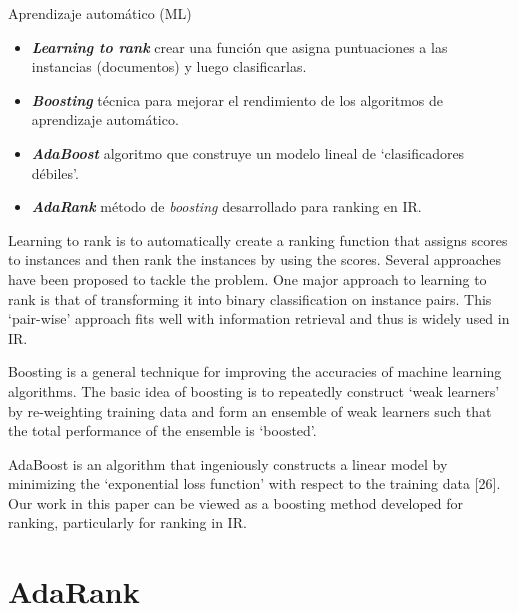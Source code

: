 \documentclass{beamer}
\begin{document}
\begin{frame}{Aprendizaje automático (ML)}
    \begin{itemize}
        \item \textbf{\textit{Learning to rank}} crear una función que asigna puntuaciones a las instancias (documentos) y luego clasificarlas.
        \item \textbf{\textit{Boosting}} técnica para mejorar el rendimiento de los algoritmos de aprendizaje automático.
        \item \textbf{\textit{AdaBoost}} algoritmo que construye un modelo lineal de ‘clasificadores débiles’.
        \item \textbf{\textit{AdaRank}} método de \textit{boosting} desarrollado para ranking en IR.
    \end{itemize}

    \begin{note}
        {Learning to rank is to automatically create a ranking function that assigns scores to instances and then rank the instances by using the scores. Several approaches have been proposed to tackle the problem. One major approach to learning to rank is that of transforming it into binary classification on instance pairs. This ‘pair-wise’ approach fits well with information retrieval and thus is widely used in IR.

        Boosting is a general technique for improving the accuracies of machine learning algorithms. The basic idea of boosting is to repeatedly construct ‘weak learners’ by re-weighting training data and form an ensemble of weak learners such that the total performance of the ensemble is ‘boosted’. 
        
        AdaBoost is an algorithm that ingeniously constructs a linear model by minimizing the ‘exponential loss function’ with respect to the training data [26]. Our work in this paper can be viewed as a boosting method developed for ranking, particularly for ranking in IR.}
    \end{note}
\end{frame}

\section{AdaRank}
\end{document}
